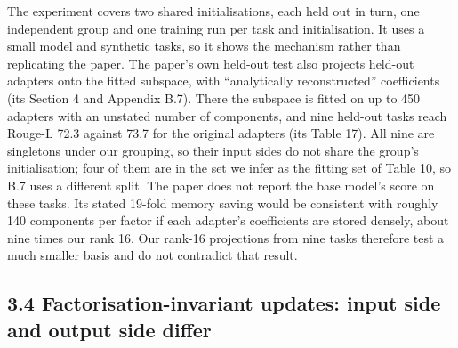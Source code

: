 \documentclass[
  11pt,
]{article}
\begin{document}
The experiment covers two shared initialisations, each held out in turn,
one independent group and one training run per task and initialisation.
It uses a small model and synthetic tasks, so it shows the mechanism
rather than replicating the paper. The paper's own held-out test also
projects held-out adapters onto the fitted subspace, with ``analytically
reconstructed'' coefficients (its Section 4 and Appendix B.7). There the
subspace is fitted on up to 450 adapters with an unstated number of
components, and nine held-out tasks reach Rouge-L 72.3 against 73.7 for
the original adapters (its Table 17). All nine are singletons under our
grouping, so their input sides do not share the group's initialisation;
four of them are in the set we infer as the fitting set of Table 10, so
B.7 uses a different split. The paper does not report the base model's
score on these tasks. Its stated 19-fold memory saving would be
consistent with roughly 140 components per factor if each adapter's
coefficients are stored densely, about nine times our rank 16. Our
rank-16 projections from nine tasks therefore test a much smaller basis
and do not contradict that result.

\subsection{3.4 Factorisation-invariant updates: input side and output
side
differ}\label{factorisation-invariant-updates-input-side-and-output-side-differ}
\end{document}
